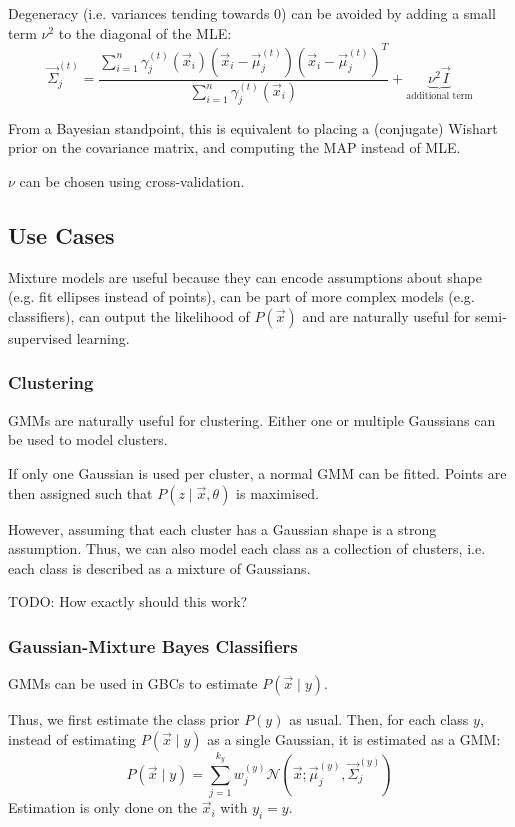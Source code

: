 Degeneracy (i.e. variances tending towards 0)
can be avoided by adding a small term $\nu^2$ to the
diagonal of the MLE:
\begin{equation*}
\vec{\Sigma}^{(t)}_j = \frac{
	\sum_{i=1}^n{
		\gamma_j^{(t)}(\vec{x}_i) (\vec{x}_i - \vec{\mu}_j^{(t)}) (\vec{x}_i - \vec{\mu}_j^{(t)})^T
	}
}{
	\sum_{i=1}^n{\gamma_j^{(t)}(\vec{x}_i)}
}
+ \underbrace{\nu^2 \vec{I}}_\text{additional term}
\end{equation*}

From a Bayesian standpoint,
this is equivalent to placing a (conjugate) Wishart prior
on the covariance matrix,
and computing the MAP instead of MLE.

$\nu$ can be chosen using cross-validation.


\subsection{Use Cases}
Mixture models are useful because
they can encode assumptions about shape
(e.g. fit ellipses instead of points),
can be part of more complex models
(e.g. classifiers),
can output the likelihood of $P(\vec{x})$
and are naturally useful for semi-supervised
learning.

\subsubsection{Clustering}
GMMs are naturally useful for clustering.
Either one or multiple Gaussians can be
used to model clusters.

If only one Gaussian is used per cluster,
a normal GMM can be fitted.
Points are then assigned such that
$P(z \mid \vec{x}, \theta)$ is maximised.

However, assuming that each cluster has
a Gaussian shape is a strong assumption.
Thus, we can also model each class as
a collection of clusters,
i.e. each class is described as a
mixture of Gaussians.

TODO: How exactly should this work?

\subsubsection{Gaussian-Mixture Bayes Classifiers}
GMMs can be used in GBCs to estimate
$P(\vec{x} \mid y)$.

Thus, we first estimate the class prior
$P(y)$ as usual.
Then, for each class $y$,
instead of estimating
$P(\vec{x} \mid y)$ as a single Gaussian,
it is estimated as a GMM:
\begin{equation*}
P(\vec{x} \mid y) = \sum_{j = 1}^{k_y}{
	w_j^{(y)}
	\mathcal{N}(\vec{x}; \vec{\mu}_j^{(y)}, \vec{\Sigma}_j^{(y)})
}
\end{equation*}
Estimation is only done on the
$\vec{x}_i$ with $y_i = y$.

